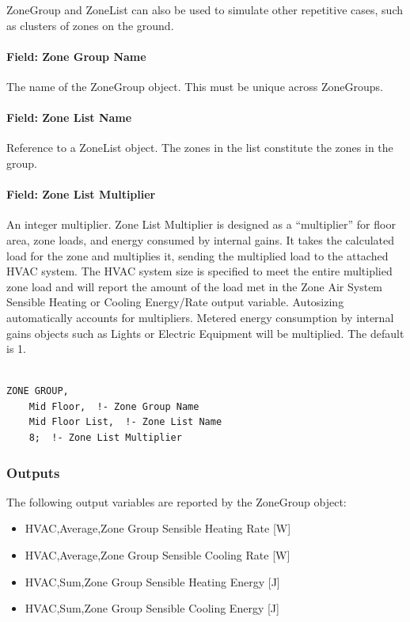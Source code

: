 ZoneGroup and ZoneList can also be used to simulate other repetitive cases, such as clusters of zones on the ground.

\paragraph{Field: Zone Group Name}\label{field-zone-group-name}

The name of the ZoneGroup object. This must be unique across ZoneGroups.

\paragraph{Field: Zone List Name}\label{field-zone-list-name-1}

Reference to a ZoneList object. The zones in the list constitute the zones in the group.

\paragraph{Field: Zone List Multiplier}\label{field-zone-list-multiplier}

An integer multiplier. Zone List Multiplier is designed as a ``multiplier'' for floor area, zone loads, and energy consumed by internal gains. It takes the calculated load for the zone and multiplies it, sending the multiplied load to the attached HVAC system. The HVAC system size is specified to meet the entire multiplied zone load and will report the amount of the load met in the Zone Air System Sensible Heating or Cooling Energy/Rate output variable. Autosizing automatically accounts for multipliers. Metered energy consumption by internal gains objects such as Lights or Electric Equipment will be multiplied. The default is 1.

\begin{lstlisting}

ZONE GROUP,
    Mid Floor,  !- Zone Group Name
    Mid Floor List,  !- Zone List Name
    8;  !- Zone List Multiplier
\end{lstlisting}

\subsubsection{Outputs}\label{outputs-2-023}

The following output variables are reported by the ZoneGroup object:

\begin{itemize}
\item
  HVAC,Average,Zone Group Sensible Heating Rate {[}W{]}
\item
  HVAC,Average,Zone Group Sensible Cooling Rate {[}W{]}
\item
  HVAC,Sum,Zone Group Sensible Heating Energy {[}J{]}
\item
  HVAC,Sum,Zone Group Sensible Cooling Energy {[}J{]}
\end{itemize}

